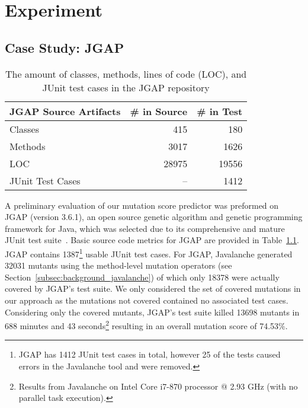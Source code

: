 \chapter{Experiment}
\label{chap:experiment}


\section{Case Study: JGAP}
\label{sec:experiment_case_study}
\begin{table}[!b]
  \centering
  \begin{tabular}{|l|r|r|}
    \hline
    \rowcolor[RGB]{169,196,223}
    \textbf{JGAP Source Artifacts} & \textbf{\# in Source} & \textbf{\# in Test} \\
    \hline Classes & 415 & 180 \\
    \hline Methods & 3017 & 1626 \\
    \hline LOC & 28975 & 19556 \\
    \hline JUnit Test Cases & -- & 1412\footnotemark[1] \\
    \hline
  \end{tabular}
  \caption{The amount of classes, methods, lines of code (LOC), and JUnit test cases in the JGAP repository}
  \label{tab:jgap_source_stats}
\end{table}

A preliminary evaluation of our mutation score predictor was preformed on JGAP (version 3.6.1), an open source genetic algorithm and genetic programming framework for Java, which was selected due to its comprehensive and mature JUnit test suite~\cite{JGAP}. Basic source code metrics for JGAP are provided in Table~\ref{tab:jgap_source_stats}. JGAP contains 1387\footnote{JGAP has 1412 JUnit test cases in total, however 25 of the tests caused errors in the Javalanche tool and were removed.} usable JUnit test cases. For JGAP, Javalanche generated 32031 mutants using the method-level mutation operators (see Section~\ref{subsec:background_javalanche}) of which only 18378 were actually covered by JGAP's test suite. We only considered the set of covered mutations in our approach as the mutations not covered contained no associated test cases. Considering only the covered mutants, JGAP's test suite killed 13698 mutants in 688 minutes and 43 seconds\footnote{Results from Javalanche on Intel Core i7-870 processor @ 2.93 GHz (with no parallel task execution).} resulting in an overall mutation score of 74.53\%.



